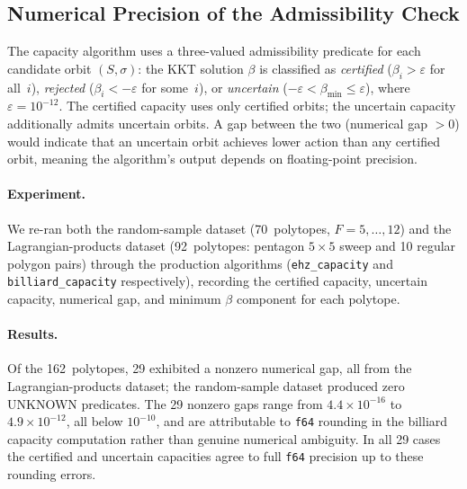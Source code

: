 %
%

\subsection{Numerical Precision of the Admissibility Check}
\label{sec:unknown-predicates}

The capacity algorithm uses a three-valued admissibility predicate for each
candidate orbit $(S, \sigma)$: the KKT solution $\beta$ is classified as
\emph{certified} ($\beta_i > \varepsilon$ for all~$i$),
\emph{rejected} ($\beta_i < -\varepsilon$ for some~$i$), or
\emph{uncertain} ($-\varepsilon < \beta_{\min} \le \varepsilon$),
where $\varepsilon = 10^{-12}$.
The certified capacity uses only certified orbits; the uncertain capacity
additionally admits uncertain orbits.
A gap between the two (numerical gap $> 0$) would indicate that an
uncertain orbit achieves lower action than any certified orbit, meaning
the algorithm's output depends on floating-point precision.

\paragraph{Experiment.}
We re-ran both the random-sample dataset (70~polytopes, $F = 5, \ldots, 12$)
and the Lagrangian-products dataset (92~polytopes: pentagon $5 \times 5$ sweep
and 10 regular polygon pairs) through the production algorithms
(\texttt{ehz\_capacity} and \texttt{billiard\_capacity} respectively),
recording the certified capacity, uncertain capacity, numerical gap,
and minimum $\beta$ component for each polytope.

\paragraph{Results.}
Of the 162~polytopes, 29 exhibited a nonzero numerical gap, all from the
Lagrangian-products dataset; the random-sample dataset produced zero
UNKNOWN predicates.
The 29 nonzero gaps range from $4.4 \times 10^{-16}$ to $4.9 \times 10^{-12}$,
all below $10^{-10}$, and are attributable to \texttt{f64} rounding in the
billiard capacity computation rather than genuine numerical ambiguity.
In all 29 cases the certified and uncertain capacities agree to full
\texttt{f64} precision up to these rounding errors.

